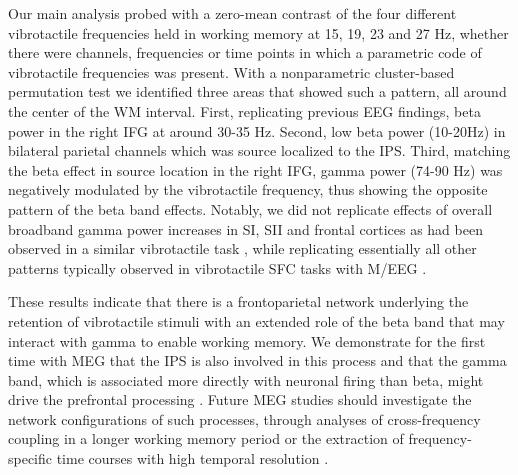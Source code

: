 Our main analysis probed with a zero-mean contrast of the four different vibrotactile frequencies held in working memory at 15, 19, 23 and 27 Hz, whether there were channels, frequencies or time points in which a parametric code of vibrotactile frequencies was present. With a nonparametric cluster-based permutation test we identified three areas that showed such a pattern, all around the center of the WM interval. First, replicating previous EEG findings, beta power in the right IFG at around 30-35 Hz. Second, low beta power (10-20Hz) in bilateral parietal channels which was source localized to the IPS. Third, matching the beta effect in source location in the right IFG, gamma power (74-90 Hz) was negatively modulated by the vibrotactile frequency, thus showing the opposite pattern of the beta band effects. Notably, we did not replicate effects of overall broadband gamma power increases in SI, SII and frontal cortices as had been observed in a similar vibrotactile task \parencite{Haegens2010}, while replicating essentially all other patterns typically observed in vibrotactile SFC tasks with M/EEG \parencite{Bauer2006,Spitzer2010}. 

These results indicate that there is a frontoparietal network underlying the retention of vibrotactile stimuli with an extended role of the beta band that may interact with gamma to enable working memory. We demonstrate for the first time with MEG that the IPS is also involved in this process and that the gamma band, which is associated more directly with neuronal firing than beta, might drive the prefrontal processing \parencite{Lundqvist2016,Whittingstall2009}. Future MEG studies should investigate the network configurations of such processes, through analyses of cross-frequency coupling in a longer working memory period or the extraction of frequency-specific time courses with high temporal resolution \parencite{Vidaurre2016,Vidaurre2018}.

